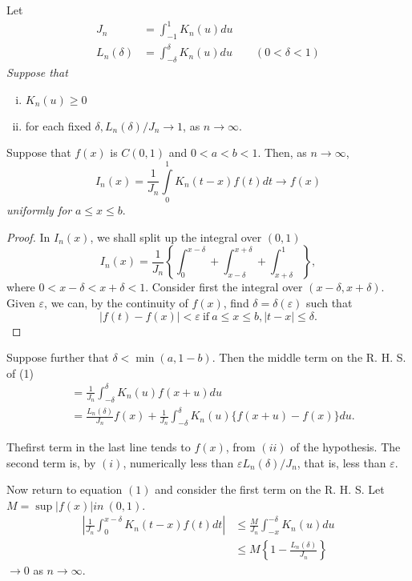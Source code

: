 \begin{theorem}\label{chap1:sec2:thm2} %
  Let 
  \begin{align*}
    J_n &= \int^{1}_{-1} K_n (u) du \\
    L_n (\delta) & = \int^\delta_{-\delta} K_n (u) du  \qquad (0 <
    \delta < 1)  
  \end{align*}
  \textit{Suppose that}
  \begin{enumerate}[(i)]
  \item $ K_n (u) \ge 0 $
  \item for each fixed $ \delta,   L_n (\delta) / J_n \to 1 $, as $
    n \to \infty $. 
\end{enumerate}

Suppose that $ f (x) $ is  $ C(0, 1) $ and $ 0 < a < b < 1
  $. Then, as $ n \to \infty $, 
$$
I_n (x) = \frac{1}{J_n} \int \limits^{1}_{0} K_n  (t-x) f (t) dt \to  f(x)
$$ 
\textit{uniformly for} $ a \leq x \leq b $.
\end{theorem}

\begin{proof}
  In  $ I_n (x) $, we shall split up the integral over $ (0,1) $
  \begin{equation*}
  I_n (x) = \frac{1}{J_n} \left\{\int^{x-\delta}_{0} +
  \int^{x + \delta}_{x-\delta}  + \int^{1}_{x+\delta} \right\}, \tag{1}
  \end{equation*}
  where $ 0 < x - \delta < x + \delta < 1 $. Consider first the
  integral over  $ (x - \delta, x + \delta) $. Given $ \varepsilon$,
  we can, by the continuity of  $ f (x) $, find $ \delta = \delta (
  \varepsilon) $ such that  
  $$
  | f (t) - f (x) | < \varepsilon  ~ \text{if}~ a \leq x \leq b, | t
  - x | \leq \delta. 
  $$
\end{proof}

Suppose further that $\delta < \min (a, 1-b)$. Then the middle
term on the R. H. S. of (1) 
\begin{align*}
  &=  \frac{1}{J_n} \int^{\delta}_{- \delta} K_n (u) f (x + u) du \\
  &= \frac{L_n (\delta)}{J_n} f (x) + \frac{1}{J_n} \int^{\delta}_{-
    \delta} K_n (u)  \big \{f (x + u) - f (x) \big \} du.
\end{align*}

The\pageoriginale first term in the last line tends to $f (x)$, from $ (ii) $ of the
hypothesis. The second term is, by $(i)$, numerically less than $
\varepsilon L_n (\delta) / J_n $, that is, less than  $ \varepsilon
$. 

Now return to equation $ (1) $ and consider the first term on the
R. H. S. Let $ M = \sup | f (x) | in ~ (0,1) $. 
\begin{align*}
  |\frac{1}{J_n} \int^{x - \delta}_{0} K_n (t -x) f (t) dt | &\leq
  \frac{M}{J_n} \int^{-\delta}_{-x} K_n (u) du \\ 
  &\leq M \left\{1 - \frac{L_n (\delta)}{J_n} \right\}
\end{align*}
$ \to 0 $ as $ n \to \infty $.

